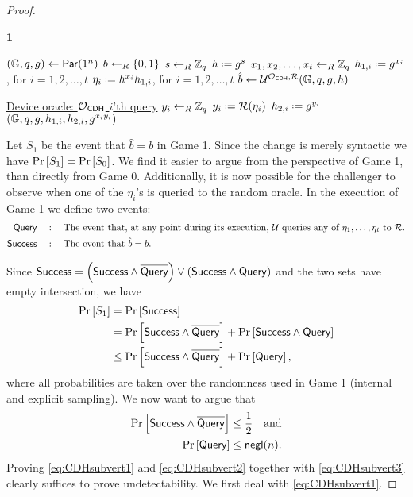 \begin{proof}
\begin{Algorithm}[]{6cm}
\captionGame
\caption{\textbf{1}}
\label{alg:CDHgame2}
\begin{algorithmic}[1]
\State $(\mathbb{G},q,g)\leftarrow\operatorname{\mathsf{Par}}(1^n)$
\State $b\leftarrow_R\left\{0,1\right\}$
\State $s\leftarrow_R\mathbb{Z}_q$
\State $h \defeq g^s$
\State $x_1,x_2,\ldots,x_t\leftarrow_R\mathbb{Z}_q$
\State $h_{1,i} \defeq g^{x_i}$, for $i = 1, 2, \ldots, t$
\State $\eta_i \defeq h^{x_i}h_{1,i}$, for $i = 1, 2, \ldots, t$
\State $\hat{b}\leftarrow\mathcal{U}^{\operatorname{\mathcal{O}}_{\mathsf{CDH}},\operatorname{\mathcal{R}}}(\mathbb{G},q,g,h)$
\Statex\hrulefill
\end{algorithmic}
\begin{algorithmic}[1]
\Statex \underline{Device oracle: \textbf{$\operatorname{\mathcal{O}}_{\mathsf{CDH}}$} $i$'th query}
\Statex
{}
\State $y_i\leftarrow_R\mathbb{Z}_q$
\Else
\State $y_i \defeq \RO(\eta_i)$
\EndIf
\State $h_{2,i} \defeq g^{y_i}$
\State \Ret $(\mathbb{G},q,g,h_{1,i},h_{2,i},g^{x_iy_i})$
\end{algorithmic}
\end{Algorithm}

Let $S_1$ be the event that $\hat{b} = b$ in Game 1. Since the change is merely syntactic we have $\operatorname{Pr}\left[{S_1}\right] = \operatorname{Pr}\left[{S_0}\right]$. We find it easier to argue from the perspective of Game 1, than directly from Game 0. Additionally, it is now possible for the challenger to observe when one of the $\eta_i$'s is queried to the random oracle. In the execution of Game 1 we define two events:
\begin{align*}
	\mathsf{Query}\quad &: \quad \mbox{The event that, at any point during its execution, $\mathcal{U}$ queries any of $\eta_1,\ldots,\eta_t$ to $\operatorname{\mathcal{R}}$.} \\
	\mathsf{Success}\quad &: \quad \mbox{The event that $\hat{b} = b$.} 
\end{align*}

Since $\mathsf{Success} = \left(\mathsf{Success}\wedge\overline{\mathstrut\mathsf{Query}}\right)\vee\left(\mathsf{Success}\wedge\mathsf{Query}\right)$ and the two sets have empty intersection, we have
\begin{align}
	\operatorname{Pr}\left[{S_1}\right] &= \operatorname{Pr}\left[{\mathsf{Success}}\right] \nonumber \\
	&= \operatorname{Pr}\left[{\mathsf{Success}\wedge\overline{\mathstrut\mathsf{Query}}}\right]+\operatorname{Pr}\left[{\mathsf{Success}\wedge\mathsf{Query}}\right] \nonumber \\
	\label{eq:CDHsubvert3} & \leq \operatorname{Pr}\left[{\mathsf{Success}\wedge\overline{\mathstrut\mathsf{Query}}}\right]+\operatorname{Pr}\left[{\mathsf{Query}}\right],
\end{align}
where all probabilities are taken over the randomness used in Game 1 (internal and explicit sampling). We now want to argue that
\begin{align}
	\label{eq:CDHsubvert1} \operatorname{Pr}\left[{\mathsf{Success}\wedge\overline{\mathstrut\mathsf{Query}}}\right] &\leq \frac{1}{2}\quad\mbox{and} \\
	\label{eq:CDHsubvert2} \operatorname{Pr}\left[{\mathsf{Query}}\right] &\leq \operatorname{\mathsf{negl}}(n). 
\end{align}
Proving \ref{eq:CDHsubvert1} and \ref{eq:CDHsubvert2} together with \ref{eq:CDHsubvert3} clearly suffices to prove undetectability. We first deal with \ref{eq:CDHsubvert1}.


\end{proof}
